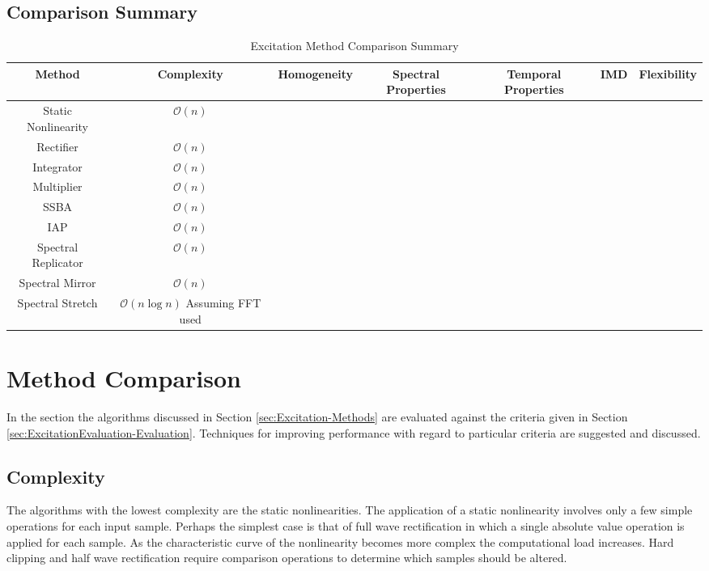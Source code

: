 \begin{landscape}
\section{Comparison Summary}
\label{sec:ExcitationEvaluation-Summary}

	\begin{table}[h!]
		\centering
		\begin{tabular}{|c|c|c|c|c|c|c|}
			\hline
			\bf{Method} & \bf{Complexity} & \bf{Homogeneity} & \bf{Spectral Properties} & 
		 	\bf{Temporal Properties} & \bf{IMD} & \bf{Flexibility} \tabularnewline %
			\hline
			\hline
			Static Nonlinearity & $\mathcal{O}(n)$ & & & & & \tabularnewline
			\hline
			Rectifier & $\mathcal{O}(n)$ & & & & & \tabularnewline
			\hline
			Integrator & $\mathcal{O}(n)$ & & & & & \tabularnewline
			\hline
			Multiplier & $\mathcal{O}(n)$ & & & & & \tabularnewline
			\hline
			SSBA & $\mathcal{O}(n)$ & & & & & \tabularnewline
			\hline
			IAP & $\mathcal{O}(n)$ & & & & & \tabularnewline
			\hline
			Spectral Replicator & $\mathcal{O}(n)$ & & & & & \tabularnewline
			\hline
			Spectral Mirror & $\mathcal{O}(n)$ & & & & & \tabularnewline
			\hline
			Spectral Stretch & $\mathcal{O}(n\log{n})$ Assuming FFT used & & & & & \tabularnewline
			\hline
		\end{tabular}
		\caption{Excitation Method Comparison Summary}
		\label{tab:ComparisonSummary}
	\end{table}

\end{landscape}

\section{Method Comparison}
\label{sec:ExcitationEvaluation-Comparison}
	In the section the algorithms discussed in Section \ref{sec:Excitation-Methods} are evaluated against the criteria
	given in Section \ref{sec:ExcitationEvaluation-Evaluation}. Techniques for improving performance with regard to
	particular criteria are suggested and discussed. 

	\subsection{Complexity}
	\label{sec:ExcitationEvaluation-Comparison-Complexity}
		The algorithms with the lowest complexity are the static nonlinearities. The application of a static
		nonlinearity involves only a few simple operations for each input sample. Perhaps the simplest case is that
		of full wave rectification in which a single absolute value operation is applied for each sample. As the
		characteristic curve of the nonlinearity becomes more complex the computational load increases. Hard
		clipping and half wave rectification require comparison operations to determine which samples should be
		altered. 

